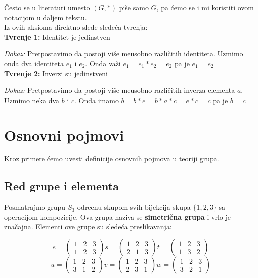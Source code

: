 \documentclass{article}
\begin{document}
Često se u literaturi umesto $(G, *)$ piše samo $G$, pa ćemo se i mi koristiti ovom notacijom u daljem tekstu. \\

Iz ovih aksioma direktno slede sledeća tvr\dj enja: \\

\textbf{Tvr\dj enje 1:} Identitet je jedinstven

\textit{Dokaz:} Pretpostavimo da postoji više me\dj usobno različitih identiteta. Uzmimo onda dva identiteta $e_1$ i $e_2$. Onda važi $e_1=e_1*e_2=e_2$ pa je $e_1=e_2$ \\

\textbf{Tvr\dj enje 2:} Inverzi su jedinstveni

\textit{Dokaz:} Pretpostavimo da postoji više me\dj usobno različitih inverza elementa $a$. Uzmimo neka dva $b$ i $c$. Onda imamo $b = b*e = b*a*c = e*c = c$ pa je $b = c$

\section{Osnovni pojmovi}

Kroz primere ćemo uvesti definicije osnovnih pojmova u teoriji grupa.

\subsection{Red grupe i elementa}

Posmatrajmo grupu $S_3$ odre\dj enu skupom svih bijekcija skupa $\{1, 2, 3\}$ sa operacijom kompozicije. Ova grupa naziva se \textbf{simetrična grupa} i vrlo je značajna. Elementi ove grupe su sledeća preslikavanja:

$$
e = \begin{pmatrix}1&2&3\\1&2&3\end{pmatrix}
s = \begin{pmatrix}1&2&3\\2&1&3\end{pmatrix}
t = \begin{pmatrix}1&2&3\\1&3&2\end{pmatrix}
$$
$$
u = \begin{pmatrix}1&2&3\\3&1&2\end{pmatrix}
v = \begin{pmatrix}1&2&3\\2&3&1\end{pmatrix}
w = \begin{pmatrix}1&2&3\\3&2&1\end{pmatrix}$$
\end{document}
